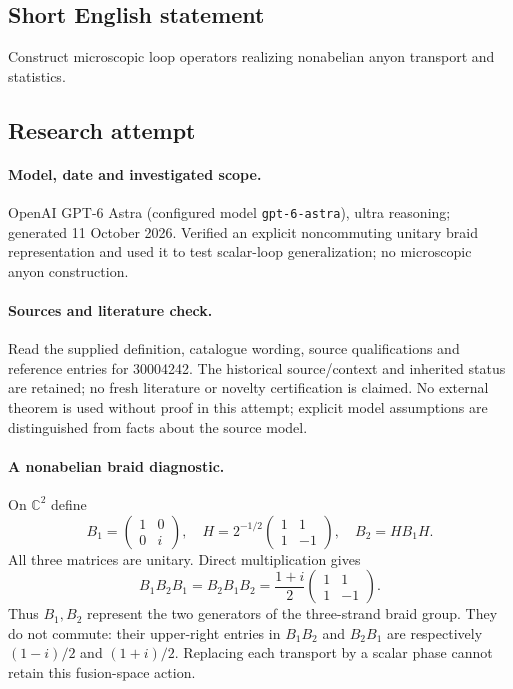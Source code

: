 \documentclass[11pt]{article}
\begin{document}
\subsection{Short English statement}
Construct microscopic loop operators realizing nonabelian anyon transport and statistics.
\subsection{Research attempt}
\paragraph{Model, date and investigated scope.}
OpenAI GPT-6 Astra (configured model \texttt{gpt-6-astra}), ultra reasoning; generated 11 October 2026. Verified an explicit noncommuting unitary braid representation and used it to test scalar-loop generalization; no microscopic anyon construction.

\paragraph{Sources and literature check.}
Read the supplied definition, catalogue wording, source qualifications and reference entries for 30004242. The historical source/context and inherited status are retained; no fresh literature or novelty certification is claimed. No external theorem is used without proof in this attempt; explicit model assumptions are distinguished from facts about the source model.

\paragraph{A nonabelian braid diagnostic.} On \(\mathbb C^2\) define
\[
 B_1=\begin{pmatrix}1&0\\0&i\end{pmatrix},\quad
 H=2^{-1/2}\begin{pmatrix}1&1\\1&-1\end{pmatrix},\quad B_2=HB_1H.
\]
All three matrices are unitary. Direct multiplication gives
\[
 B_1B_2B_1=B_2B_1B_2=\frac{1+i}{2}\begin{pmatrix}1&1\\1&-1\end{pmatrix}.
\]
Thus \(B_1,B_2\) represent the two generators of the three-strand braid group. They do not commute: their upper-right entries in \(B_1B_2\) and \(B_2B_1\) are respectively \((1-i)/2\) and \((1+i)/2\). Replacing each transport by a scalar phase cannot retain this fusion-space action.
\end{document}
